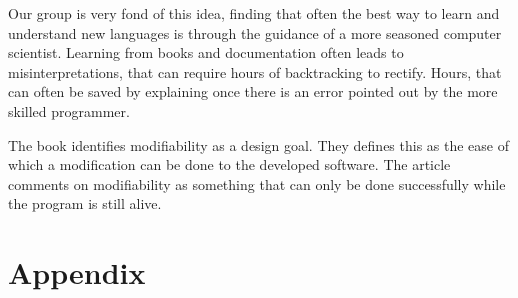 \documentclass[12pt]{article}
\begin{document}
Our group is very fond of this idea, finding that often the best way to learn and understand new languages is through the guidance of a more seasoned computer scientist. Learning from books and documentation often leads to misinterpretations, that can require hours of backtracking to rectify. Hours, that can often be saved by explaining once there is an error pointed out by the more skilled programmer.

The book identifies modifiability as a design goal. They defines this as the ease of which a modification can be done to the developed software. The article comments on modifiability as something that can only be done successfully while the program is still alive. 
\newpage 
\section{Appendix}
\end{document}
